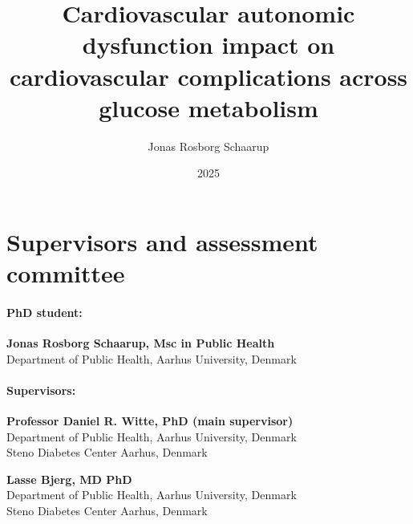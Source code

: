 \documentclass[
  letterpaper,
  headsepline=true,
  open=any]{scrbook}
\title{Cardiovascular autonomic dysfunction impact on cardiovascular
complications across glucose metabolism}
\author{Jonas Rosborg Schaarup}
\date{2025}
\begin{document}
\frontmatter
\maketitle
\ifdefined\Shaded\renewenvironment{Shaded}{\begin{tcolorbox}[interior hidden, borderline west={3pt}{0pt}{shadecolor}, frame hidden, sharp corners, enhanced, boxrule=0pt, breakable]}{\end{tcolorbox}}\fi

\mainmatter
{}

\hypertarget{section}{%
\chapter{}\label{section}}


\hypertarget{supervisors-and-assessment-committee}{%
\chapter*{Supervisors and assessment
committee}\label{supervisors-and-assessment-committee}}


\hypertarget{phd-student}{%
\subsubsection*{PhD student:}\label{phd-student}}

\textbf{Jonas Rosborg Schaarup, Msc in Public Health}\\
Department of Public Health, Aarhus University, Denmark

\hypertarget{supervisors}{%
\subsubsection*{Supervisors:}\label{supervisors}}

\textbf{Professor Daniel R. Witte, PhD (main supervisor)}\\
Department of Public Health, Aarhus University, Denmark\\
Steno Diabetes Center Aarhus, Denmark

\textbf{Lasse Bjerg, MD PhD}\\
Department of Public Health, Aarhus University, Denmark\\
Steno Diabetes Center Aarhus, Denmark
\end{document}
